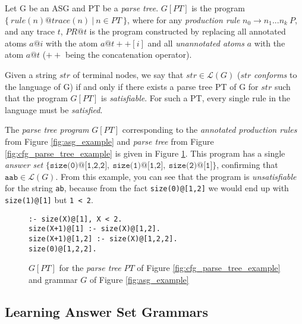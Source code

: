 \begin{definition}
Let G be an ASG and PT be a \textit{parse tree}. $G[PT]$ is the program $\{\ rule(n)@trace(n)\ |\ n \in PT\ \}$, where for any \textit{production rule} $n_0 \to n_1...n_k\ P$, and any trace $t$, $PR@t$ is the program constructed by replacing all annotated atoms $a@i$ with the atom $a@t++[i]$ and all \textit{unannotated atoms} $a$ with the atom $a@t$ ($++$ being the concatenation operator).
\end{definition}

\begin{definition}
\label{def:conforming_parse_tree}
Given a string $str$ of terminal nodes, we say that $str \in \mathcal{L}(G)$ ($str$ \textit{conforms} to the language of G) if and only if there exists a parse tree PT of G for $str$ such that the program $G[PT]$ is \textit{satisfiable}. For such a PT, every single rule in the language must be \textit{satisfied}.
\end{definition}

\noindent
The \textit{parse tree program} $G[PT]$ corresponding to the \textit{annotated production rules} from Figure \ref{fig:asg_example} and \textit{parse tree} from Figure \ref{fig:cfg_parse_tree_example} is given in Figure \ref{fig:asg_tree_program_example}. This program has a single \textit{answer set} $\{\texttt{size(0)@[1,2,2]},\ \texttt{size(1)@[1,2]},\ \texttt{size(2)@[1]}\}$, confirming that $\texttt{aab} \in \mathcal{L}(G)$. From this example, you can see that the program is \textit{unsatisfiable} for the string \texttt{ab}, because from the fact \texttt{size(0)@[1,2]} we would end up with \texttt{size(1)@[1]} but \texttt{1 < 2}.

\begin{figure}[H]
\centering
\texttt{:- size(X)@[1], X < 2. \\
           size(X+1)@[1] :- size(X)@[1,2]. \\
           size(X+1)@[1,2] :- size(X)@[1,2,2]. \\
           size(0)@[1,2,2].}
\caption{$G[PT]$ for the \textit{parse tree} $PT$ of Figure \ref{fig:cfg_parse_tree_example} and grammar $G$ of Figure \ref{fig:asg_example}}
\label{fig:asg_tree_program_example}
\end{figure}

\subsection*{Learning Answer Set Grammars}

